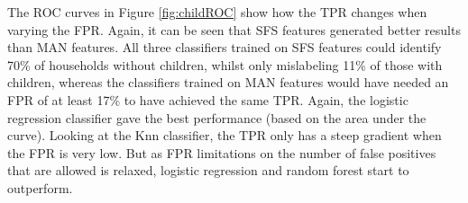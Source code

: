 %
\childMat

\childROC
The ROC curves in Figure \ref{fig:childROC} show how the TPR changes when varying the FPR. Again, it can be seen that SFS features generated better results than MAN features. All three classifiers trained on SFS features could identify 70\% of households without children, whilst only mislabeling 11\% of those with children, whereas the classifiers trained on MAN features would have needed an FPR of at least 17\% to have achieved the same TPR. Again, the logistic regression classifier gave the best performance (based on the area under the curve). Looking at the Knn classifier, the TPR only has a steep gradient when the FPR is very low.  But as FPR limitations on the number of false positives that are allowed is relaxed, logistic regression and random forest start to outperform.



